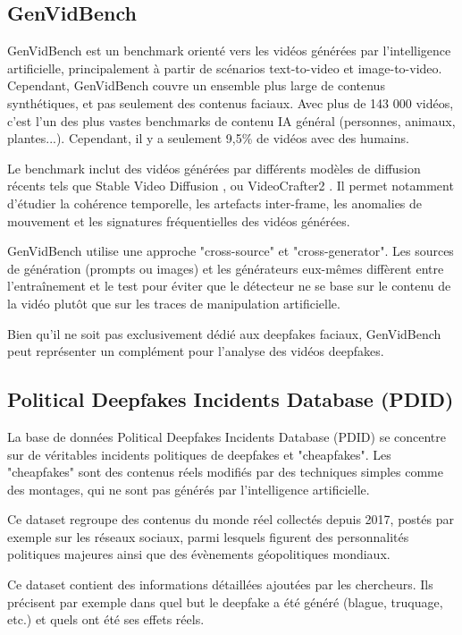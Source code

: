 \documentclass[runningheads]{llncs}
\begin{document}
\subsection{GenVidBench}

GenVidBench \citep{ni} est un benchmark orienté vers les vidéos générées par l'intelligence artificielle, principalement à partir de scénarios text-to-video et image-to-video. Cependant, GenVidBench couvre un ensemble plus large de contenus synthétiques, et pas seulement des contenus faciaux. Avec plus de 143 000 vidéos, c'est l'un des plus vastes benchmarks de contenu IA général (personnes, animaux, plantes...). Cependant, il y a seulement 9,5\% de vidéos avec des humains.

Le benchmark inclut des vidéos générées par différents modèles de diffusion récents tels que Stable Video Diffusion \citep{blattmann}, ou VideoCrafter2 \citep{chen2}. Il permet notamment d’étudier la cohérence temporelle, les artefacts inter-frame, les anomalies de mouvement et les signatures fréquentielles des vidéos générées.

GenVidBench utilise une approche "cross-source" et "cross-generator". Les sources de génération (prompts ou images) et les générateurs eux-mêmes diffèrent entre l'entraînement et le test pour éviter que le détecteur ne se base sur le contenu de la vidéo plutôt que sur les traces de manipulation artificielle.

Bien qu’il ne soit pas exclusivement dédié aux deepfakes faciaux, GenVidBench peut représenter un complément pour l’analyse des vidéos deepfakes.

\subsection{Political Deepfakes Incidents Database (PDID)}

La base de données Political Deepfakes Incidents Database (PDID) \citep{walker} se concentre sur de véritables incidents politiques de deepfakes et "cheapfakes". Les "cheapfakes" sont des contenus réels modifiés par des techniques simples comme des montages, qui ne sont pas générés par l'intelligence artificielle. 

Ce dataset regroupe des contenus du monde réel collectés depuis 2017, postés par exemple sur les réseaux sociaux, parmi lesquels figurent des personnalités politiques majeures ainsi que des évènements géopolitiques mondiaux.

Ce dataset contient des informations détaillées ajoutées par les chercheurs. Ils précisent par exemple dans quel but le deepfake a été généré (blague, truquage, etc.) et quels ont été ses effets réels. 
\end{document}
